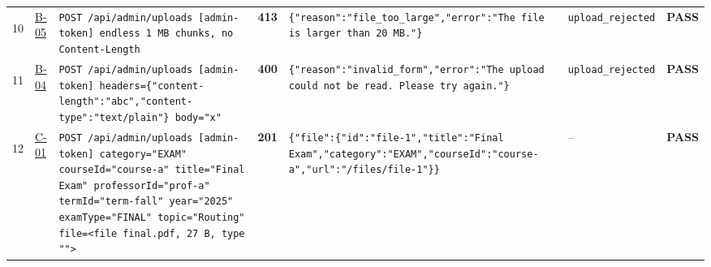 \documentclass[10pt,a4paper]{article}
\begin{document}
\begin{landscape}
\begin{longtable}{@{}P{0.6cm}P{0.9cm}P{8.5cm}P{1.0cm}P{6.2cm}P{4.2cm}P{1.1cm}@{}}
\hypertarget{call10}{10} & \hyperlink{test-B-05}{B-05} & \texttt{POST /\allowbreak{}api/\allowbreak{}admin/\allowbreak{}uploads [admin-\allowbreak{}token] endless 1 MB chunks,\allowbreak{} no Content-\allowbreak{}Length} & \textcolor{warnamber}{\textbf{413}} & \texttt{\{"\allowbreak{}reason"\allowbreak{}:\allowbreak{}"\allowbreak{}file\_\allowbreak{}too\_\allowbreak{}large"\allowbreak{},\allowbreak{}"\allowbreak{}error"\allowbreak{}:\allowbreak{}"\allowbreak{}The file is larger than 20 MB.\allowbreak{}"\allowbreak{}\}} & \texttt{upload\_\allowbreak{}rejected} & \textcolor{passgreen}{\textbf{PASS}} \\
\hypertarget{call11}{11} & \hyperlink{test-B-04}{B-04} & \texttt{POST /\allowbreak{}api/\allowbreak{}admin/\allowbreak{}uploads [admin-\allowbreak{}token] headers=\allowbreak{}\{"\allowbreak{}content-\allowbreak{}length"\allowbreak{}:\allowbreak{}"\allowbreak{}abc"\allowbreak{},\allowbreak{}"\allowbreak{}content-\allowbreak{}type"\allowbreak{}:\allowbreak{}"\allowbreak{}text/\allowbreak{}plain"\allowbreak{}\} body=\allowbreak{}"\allowbreak{}x"\allowbreak{}} & \textcolor{warnamber}{\textbf{400}} & \texttt{\{"\allowbreak{}reason"\allowbreak{}:\allowbreak{}"\allowbreak{}invalid\_\allowbreak{}form"\allowbreak{},\allowbreak{}"\allowbreak{}error"\allowbreak{}:\allowbreak{}"\allowbreak{}The upload could not be read.\allowbreak{} Please try again.\allowbreak{}"\allowbreak{}\}} & \texttt{upload\_\allowbreak{}rejected} & \textcolor{passgreen}{\textbf{PASS}} \\
\hypertarget{call12}{12} & \hyperlink{test-C-01}{C-01} & \texttt{POST /\allowbreak{}api/\allowbreak{}admin/\allowbreak{}uploads [admin-\allowbreak{}token] category=\allowbreak{}"\allowbreak{}EXAM"\allowbreak{} courseId=\allowbreak{}"\allowbreak{}course-\allowbreak{}a"\allowbreak{} title=\allowbreak{}"\allowbreak{}Final Exam"\allowbreak{} professorId=\allowbreak{}"\allowbreak{}prof-\allowbreak{}a"\allowbreak{} termId=\allowbreak{}"\allowbreak{}term-\allowbreak{}fall"\allowbreak{} year=\allowbreak{}"\allowbreak{}2025"\allowbreak{} examType=\allowbreak{}"\allowbreak{}FINAL"\allowbreak{} topic=\allowbreak{}"\allowbreak{}Routing"\allowbreak{} file=\allowbreak{}<file final.\allowbreak{}pdf,\allowbreak{} 27 B,\allowbreak{} type "\allowbreak{}"\allowbreak{}>} & \textcolor{passgreen}{\textbf{201}} & \texttt{\{"\allowbreak{}file"\allowbreak{}:\allowbreak{}\{"\allowbreak{}id"\allowbreak{}:\allowbreak{}"\allowbreak{}file-\allowbreak{}1"\allowbreak{},\allowbreak{}"\allowbreak{}title"\allowbreak{}:\allowbreak{}"\allowbreak{}Final Exam"\allowbreak{},\allowbreak{}"\allowbreak{}category"\allowbreak{}:\allowbreak{}"\allowbreak{}EXAM"\allowbreak{},\allowbreak{}"\allowbreak{}courseId"\allowbreak{}:\allowbreak{}"\allowbreak{}course-\allowbreak{}a"\allowbreak{},\allowbreak{}"\allowbreak{}url"\allowbreak{}:\allowbreak{}"\allowbreak{}/\allowbreak{}files/\allowbreak{}file-\allowbreak{}1"\allowbreak{}\}\}} & -- & \textcolor{passgreen}{\textbf{PASS}} \\

\end{longtable}
\end{landscape}
\end{document}

